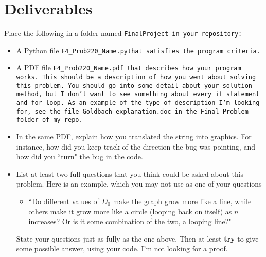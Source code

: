 \documentclass{article}
\newcommand\foldername{\tt{FinalProject} }
\newcommand\filename{\tt{F4\_Prob220\_Name.py}\;\;}
\begin{document}
\section*{Deliverables}
	
	
	Place the following in a folder named \foldername in your repository:
	\begin{itemize}
		\item A Python file \filename  that satisfies the program criteria.
		\item A PDF file \tt{F4\_Prob220\_Name.pdf} that describes how your program works.  This should be a description of how you went about solving this problem.  You should go into some detail about your solution method, but I don't want to see something about every \tt{if} statement and \tt{for} loop.  As an example of the type of description I'm looking for, see the file \tt{Goldbach\_explanation.doc} in the \tt{Final Problem} folder of my repo.
		\item In the same PDF, explain how you translated the string into graphics.  For instance, how did you keep track of the direction  the bug was pointing, and how did you ``turn" the bug in the code.
		\item List at least two full questions that you think could be asked about this problem.  Here is an example, which you may not use as one of your questions
		\begin{itemize}
			\item ``Do different values of $D_0$ make the graph grow more like a line, while others make it grow more like a circle (looping back on itself) as $n$ increases?  Or is it some combination of the two, a looping line?"
		\end{itemize}
		State your questions just as fully as the one above.  Then at least \textbf{try} to give some possible answer, using your code.  I'm not  looking for a proof.

	\end{itemize}

	
\end{document}
